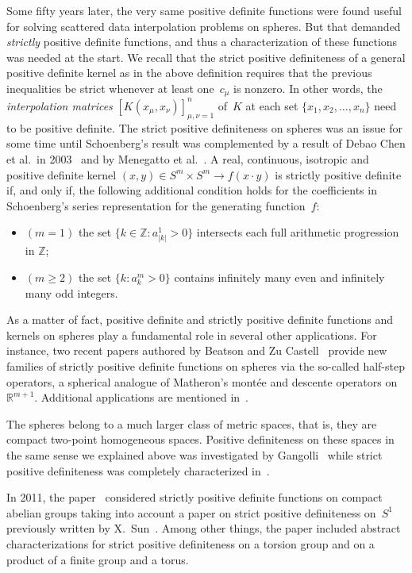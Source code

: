 \documentclass[pdftex]{sigma}
\numberwithin{equation}{section}
\begin{document}
Some f\/ifty years later, the very same positive def\/inite functions were found useful for solving scattered data interpolation problems on spheres. But that demanded {\em strictly} positive def\/inite functions, and thus a characterization of these functions was needed at the start. We recall that the strict positive def\/initeness of a general positive def\/inite kernel as in the above def\/inition requires that the previous inequalities be strict whenever at least one~$c_\mu$ is nonzero. In other words, the {\em interpolation matrices} $[K(x_\mu , x_\nu)]_{\mu,\nu=1}^n$ of~$K$ at each set $\{x_1, x_2, \ldots, x_n\}$ need to be positive def\/inite. The strict positive def\/initeness on spheres was an issue for some time until Schoenberg's result was complemented by a result of Debao Chen et al.\ in 2003~\cite{chen} and by Menegatto et al.~\cite{menegatto}. A real, continuous, isotropic and positive def\/inite kernel $(x,y) \in S^m \times S^m \to f(x \cdot y)$ is strictly positive def\/inite if, and only if, the following additional condition holds for the coef\/f\/icients in Schoenberg's series representation for the generating function~$f$:
\begin{itemize}\itemsep=0pt
\item[--] $(m=1)$ the set $\{k \in \mathbb{Z}\colon a_{|k|}^1>0\}$ intersects each full arithmetic progression in $\mathbb{Z}$;
\item[--] $(m\geq 2)$ the set $\{k \colon a_k^m >0\}$ contains inf\/initely many even and inf\/initely many odd integers.
\end{itemize}

As a matter of fact, positive def\/inite and strictly positive def\/inite functions and kernels on spheres play a fundamental role in several other applications. For instance, two recent papers authored by Beatson and Zu Castell~\cite{beat,beat1} provide new families of strictly positive def\/inite functions on spheres via the so-called half-step operators, a spherical analogue of Matheron's mont\'ee and descente operators on~$\mathbb{R}^{m+1}$. Additional applications are mentioned in~\cite{berg,gneiting}.

The spheres belong to a much larger class of metric spaces, that is, they are compact two-point homogeneous spaces. Positive def\/initeness on these spaces in the same sense we explained above was investigated by Gangolli~\cite{gangolli} while strict positive def\/initeness was completely characterized in~\cite{barbosa}.

In 2011, the paper~\cite{emonds} considered strictly positive def\/inite functions on compact abelian groups taking into account a paper on strict positive def\/initeness on~$S^1$ previously written by X.~Sun~\cite{xingping}. Among other things, the paper included abstract characterizations for strict positive def\/initeness on a torsion group and on a product of a f\/inite group and a torus.
\end{document}
